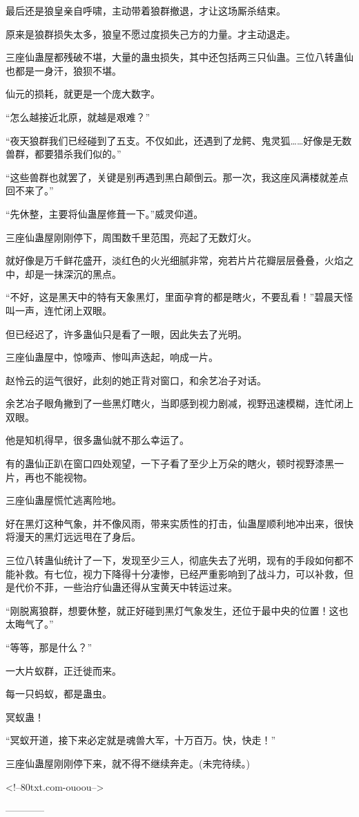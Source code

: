 \begin{this_body}
最后还是狼皇亲自呼啸，主动带着狼群撤退，才让这场厮杀结束。

原来是狼群损失太多，狼皇不愿过度损失己方的力量。才主动退走。

三座仙蛊屋都残破不堪，大量的蛊虫损失，其中还包括两三只仙蛊。三位八转蛊仙也都是一身汗，狼狈不堪。

仙元的损耗，就更是一个庞大数字。

“怎么越接近北原，就越是艰难？”

“夜天狼群我们已经碰到了五支。不仅如此，还遇到了龙鳄、鬼灵狐……好像是无数兽群，都要猎杀我们似的。”

“这些兽群也就罢了，关键是别再遇到黑白颠倒云。那一次，我这座风满楼就差点回不来了。”

“先休整，主要将仙蛊屋修葺一下。”威灵仰道。

三座仙蛊屋刚刚停下，周围数千里范围，亮起了无数灯火。

就好像是万千鲜花盛开，淡红色的火光细腻非常，宛若片片花瓣层层叠叠，火焰之中，却是一抹深沉的黑点。

“不好，这是黑天中的特有天象黑灯，里面孕育的都是瞎火，不要乱看！”碧晨天怪叫一声，连忙闭上双眼。

但已经迟了，许多蛊仙只是看了一眼，因此失去了光明。

三座仙蛊屋中，惊嚎声、惨叫声迭起，响成一片。

赵怜云的运气很好，此刻的她正背对窗口，和余艺冶子对话。

余艺冶子眼角撇到了一些黑灯瞎火，当即感到视力剧减，视野迅速模糊，连忙闭上双眼。

他是知机得早，很多蛊仙就不那么幸运了。

有的蛊仙正趴在窗口四处观望，一下子看了至少上万朵的瞎火，顿时视野漆黑一片，再也不能视物。

三座仙蛊屋慌忙逃离险地。

好在黑灯这种气象，并不像风雨，带来实质性的打击，仙蛊屋顺利地冲出来，很快将漫天的黑灯远远甩在了身后。

三位八转蛊仙统计了一下，发现至少三人，彻底失去了光明，现有的手段如何都不能补救。有七位，视力下降得十分凄惨，已经严重影响到了战斗力，可以补救，但是代价不菲，一些治疗仙蛊还得从宝黄天中转运过来。

“刚脱离狼群，想要休整，就正好碰到黑灯气象发生，还位于最中央的位置！这也太晦气了。”

“等等，那是什么？”

一大片蚁群，正迁徙而来。

每一只蚂蚁，都是蛊虫。

冥蚁蛊！

“冥蚁开道，接下来必定就是魂兽大军，十万百万。快，快走！”

三座仙蛊屋刚刚停下来，就不得不继续奔走。(未完待续。)

<!--80txt.com-ouoou-->

------------

\end{this_body}

